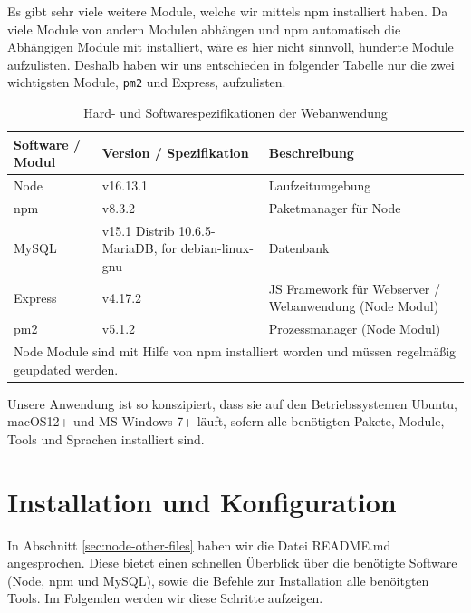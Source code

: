 Es gibt sehr viele weitere Module, welche wir mittels npm installiert haben. Da viele Module von andern Modulen abhängen und npm automatisch die Abhängigen Module mit installiert, wäre es hier nicht sinnvoll, hunderte Module aufzulisten. Deshalb haben wir uns entschieden in folgender Tabelle nur die zwei wichtigsten Module, \verb|pm2| und Express, aufzulisten.

\begin{table}[H]
    \caption{Hard- und Softwarespezifikationen der Webanwendung}
    \label{tab:node-specs}
    \setlength{\tabcolsep}{3pt}
    \begin{tabular}{|p{70pt}|p{120pt}|p{180pt}|}
        \hline
        Software / Modul & Version / Spezifikation                            & Beschreibung                                           \\
        \hline\hline
        Node             & v16.13.1                                           & Laufzeitumgebung                                       \\
        \hline
        npm              & v8.3.2                                             & Paketmanager für Node                                  \\
        \hline
        MySQL            & v15.1 Distrib 10.6.5-MariaDB, for debian-linux-gnu & Datenbank                                              \\
        \hline
        Express          & v4.17.2                                            & JS Framework für Webserver / Webanwendung (Node Modul) \\
        \hline
        pm2              & v5.1.2                                             & Prozessmanager (Node Modul)                            \\
        \hline
        \multicolumn{3}{p{400pt}}{Node Module sind mit Hilfe von npm installiert worden und müssen regelmäßig geupdated werden.}
    \end{tabular}
\end{table}

Unsere Anwendung ist so konszipiert, dass sie auf den Betriebssystemen Ubuntu, macOS12+ und MS Windows 7+ läuft, sofern alle benötigten Pakete, Module, Tools und Sprachen installiert sind.\\

\newpage
\section{Installation und Konfiguration}
\label{sec:nodechapter-installation}
In Abschnitt \ref{sec:node-other-files} haben wir die Datei README.md angesprochen. Diese bietet einen schnellen Überblick über
die benötigte Software (Node, npm und MySQL), sowie die Befehle zur Installation alle benöitgten Tools. Im Folgenden werden wir
diese Schritte aufzeigen.

